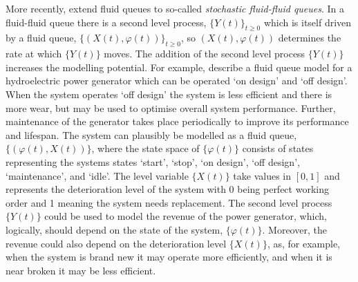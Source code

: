 More recently, \cite{bo2014} extend fluid queues to so-called \emph{stochastic fluid-fluid queues}. In a fluid-fluid queue there is a second level process, \(\{Y(t)\}_{t\geq0}\) which is itself driven by a fluid queue, \(\{(X(t),\varphi(t))\}_{t\geq0}\), so \((X(t),\varphi(t))\) determines the rate at which \(\{Y(t)\}\) moves. The addition of the second level process \(\{Y(t)\}\) increases the modelling potential. For example, \cite{hydro} describe a fluid queue model for a hydroelectric power generator which can be operated `on design' and `off design'. When the system operates `off design' the system is less efficient and there is more wear, but may be used to optimise overall system performance. Further, maintenance of the generator takes place periodically to improve its performance and lifespan. The system can plausibly be modelled as a fluid queue, \(\{(\varphi(t),X(t))\}\), where the state space of \(\{\varphi(t)\}\) consists of states representing the systems states `start', `stop', `on design', `off design', `maintenance', and `idle'. The level variable \(\{X(t)\}\) take values in \([0,1]\) and represents the deterioration level of the system with 0 being perfect working order and 1 meaning the system needs replacement. The second level process \(\{Y(t)\}\) could be used to model the revenue of the power generator, which, logically, should depend on the state of the system, \(\{\varphi(t)\}\). Moreover, the revenue could also depend on the deterioration level \(\{X(t)\}\), as, for example, when the system is brand new it may operate more efficiently, and when it is near broken it may be less efficient. 


